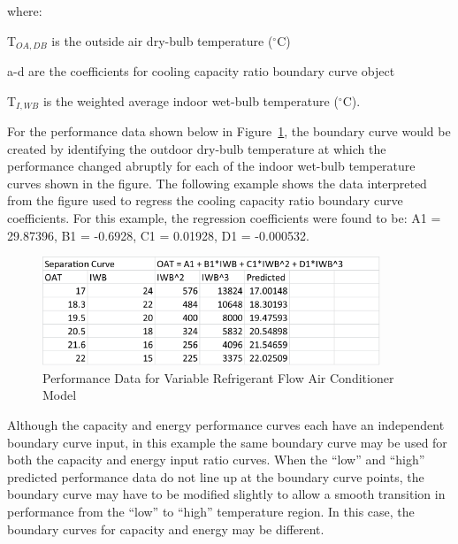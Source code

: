 where:

T\(_{OA,DB}\) is the outside air dry-bulb temperature (\(^{\circ}\)C)

a-d are the coefficients for cooling capacity ratio boundary curve object

T\(_{I,WB}\) is the weighted average indoor wet-bulb temperature (\(^{\circ}\)C).

For the performance data shown below in Figure~\ref{fig:performance-data-for-variable-refrigerant-flow-air-conditioner-model}, the boundary curve would be created by identifying the outdoor dry-bulb temperature at which the performance changed abruptly for each of the indoor wet-bulb temperature curves shown in the figure. The following example shows the data interpreted from the figure used to regress the cooling capacity ratio boundary curve coefficients. For this example, the regression coefficients were found to be: A1 = 29.87396, B1 = -0.6928, C1 = 0.01928, D1 = -0.000532.

\begin{figure}[hbtp] %
\centering
\includegraphics[width=0.9\textwidth, height=0.9\textheight, keepaspectratio=true]{media/image5339.png}
\caption{Performance Data for Variable Refrigerant Flow Air Conditioner Model \label{fig:performance-data-for-variable-refrigerant-flow-air-conditioner-model}}
\end{figure}

Although the capacity and energy performance curves each have an independent boundary curve input, in this example the same boundary curve may be used for both the capacity and energy input ratio curves. When the ``low'' and ``high'' predicted performance data do not line up at the boundary curve points, the boundary curve may have to be modified slightly to allow a smooth transition in performance from the ``low'' to ``high'' temperature region. In this case, the boundary curves for capacity and energy may be different.

